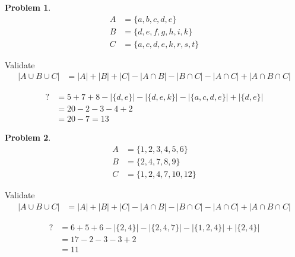 \documentclass{article}
\theoremstyle{definition}
\newtheorem{problem}{Problem}[section]
\begin{document}
\begin{problem}
\[

    \begin{aligned}
       A &= \{a, b, c, d, e\}\\
       B &= \{d, e, f, g, h, i, k\}\\
       C &= \{a, c, d, e, k, r, s, t\}
    \end{aligned}
\]

Validate
\[
    \begin{aligned}
        |A \cup B \cup C| &= |A| + |B| + |C| - |A \cap B| - |B \cap C| - |A \cap C| + |A \cap B \cap C|
    \end{aligned}
\]

\[
    \begin{aligned}
        ? &= 5 + 7 + 8 - |\{d, e\}| - |\{d, e, k\}| - |\{a, c, d, e\}| + |\{d, e\}|\\
         &= 20 - 2 - 3 - 4 + 2\\
        &= 20 - 7 = 13
    \end{aligned}
\]
\end{problem}



\begin{problem}
\[

    \begin{aligned}
       A &= \{1, 2, 3, 4, 5, 6\}\\
       B &= \{2, 4, 7, 8, 9\}\\
       C &= \{1, 2, 4, 7, 10, 12\}
    \end{aligned}
\]

Validate
\[
    \begin{aligned}
        |A \cup B \cup C| &= |A| + |B| + |C| - |A \cap B| - |B \cap C| - |A \cap C| + |A \cap B \cap C|
    \end{aligned}
\]

\[
    \begin{aligned}
        ? &= 6 + 5 + 6 - |\{2, 4\}| - |\{2, 4, 7\}| - |\{1, 2, 4\}| + |\{2, 4\}|\\
        &= 17 - 2 - 3 - 3 + 2\\
        &= 11
    \end{aligned}
\]
\end{problem}
\end{document}
